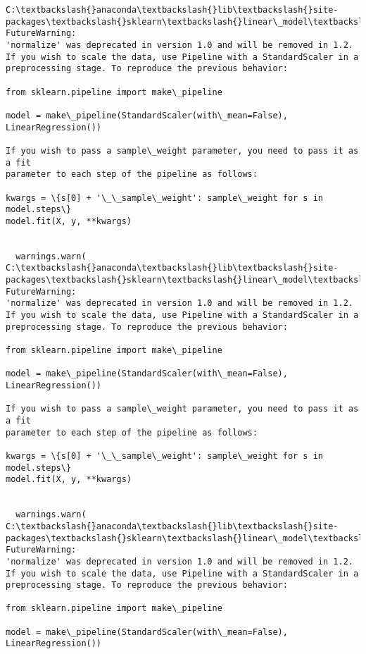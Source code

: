 \documentclass[11pt]{article}
\begin{document}
    \begin{Verbatim}[commandchars=\\\{\}]
C:\textbackslash{}anaconda\textbackslash{}lib\textbackslash{}site-packages\textbackslash{}sklearn\textbackslash{}linear\_model\textbackslash{}\_base.py:141: FutureWarning:
'normalize' was deprecated in version 1.0 and will be removed in 1.2.
If you wish to scale the data, use Pipeline with a StandardScaler in a
preprocessing stage. To reproduce the previous behavior:

from sklearn.pipeline import make\_pipeline

model = make\_pipeline(StandardScaler(with\_mean=False), LinearRegression())

If you wish to pass a sample\_weight parameter, you need to pass it as a fit
parameter to each step of the pipeline as follows:

kwargs = \{s[0] + '\_\_sample\_weight': sample\_weight for s in model.steps\}
model.fit(X, y, **kwargs)


  warnings.warn(
C:\textbackslash{}anaconda\textbackslash{}lib\textbackslash{}site-packages\textbackslash{}sklearn\textbackslash{}linear\_model\textbackslash{}\_base.py:141: FutureWarning:
'normalize' was deprecated in version 1.0 and will be removed in 1.2.
If you wish to scale the data, use Pipeline with a StandardScaler in a
preprocessing stage. To reproduce the previous behavior:

from sklearn.pipeline import make\_pipeline

model = make\_pipeline(StandardScaler(with\_mean=False), LinearRegression())

If you wish to pass a sample\_weight parameter, you need to pass it as a fit
parameter to each step of the pipeline as follows:

kwargs = \{s[0] + '\_\_sample\_weight': sample\_weight for s in model.steps\}
model.fit(X, y, **kwargs)


  warnings.warn(
C:\textbackslash{}anaconda\textbackslash{}lib\textbackslash{}site-packages\textbackslash{}sklearn\textbackslash{}linear\_model\textbackslash{}\_base.py:141: FutureWarning:
'normalize' was deprecated in version 1.0 and will be removed in 1.2.
If you wish to scale the data, use Pipeline with a StandardScaler in a
preprocessing stage. To reproduce the previous behavior:

from sklearn.pipeline import make\_pipeline

model = make\_pipeline(StandardScaler(with\_mean=False), LinearRegression())


\end{Verbatim}
\end{document}
